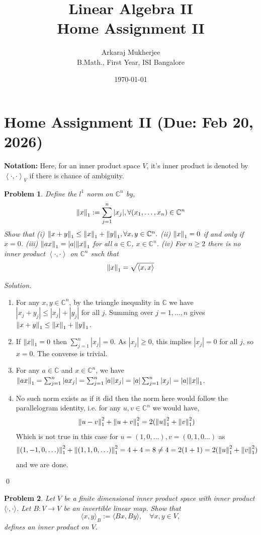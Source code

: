 \documentclass[12pt,a4paper]{article}
\title{\textbf{Linear Algebra II} \\ \large Home Assignment II}
\author{Arkaraj Mukherjee \\ B.Math., First Year, ISI Bangalore}
\date{\today}
\newenvironment{solution}{%
  \par\noindent\textit{Solution.}\ }{\qed}
\theoremstyle{problemstyle}
\newtheorem{problem}{Problem}[section]
\def\bC{\mathbb{C}}
\newcommand{\inp}[2]{{\left\langle{#1},{#2}\right\rangle}}
\begin{document}
\maketitle
\newpage
\tableofcontents
\newpage
\section{Home Assignment II (Due: Feb 20, 2026)}
\noindent \textbf{Notation:} Here, for an inner product space $V$, it's inner product is denoted by $\inp{\cdot}{\cdot}_V$ if there is chance of ambiguity.
\begin{problem}\label{prob:2-1}
Define the $l^1$ norm on $\bC^n$ by,
\[\norm{x}_1:=\sum_{j=1}^n|x_j|,\forall(x_1,\ldots,x_n)\in\bC^n\]
Show that (i) $\norm{x+y}_1\leq\norm{x}_1+\norm{y}_1,\forall x,y\in\bC^n.$ (ii) $\norm{x}_1=0$ if and only if $x=0$.
(iii) $\norm{ax}_1=|a|\norm{x}_1$ for all $a\in\bC$, $x\in\bC^n$.
(iv) For $n\geq 2$ there is no inner product $\inp{\cdot}{\cdot}$ on $\bC^n$ such that
\[\norm{x}_1=\sqrt{\inp{x}{x}}\]
\end{problem}
\begin{solution}
	\begin{enumerate}[label=(\roman*)]
    \item For any $x,y\in\bC^n$, by the triangle inequality in $\bC$ we have $|x_j+y_j|\le|x_j|+|y_j|$ for all $j$.
Summing over $j=1,\ldots,n$ gives $\norm{x+y}_1\le\norm{x}_1+\norm{y}_1$.
    \item If $\norm{x}_1=0$ then $\sum_{j=1}^n|x_j|=0$.
As $|x_j|\ge 0$, this implies $|x_j|=0$ for all $j$, so $x=0$. The converse is trivial.
    \item For any $a\in\bC$ and $x\in\bC^n$, we have $\norm{ax}_1=\sum_{j=1}^n|ax_j|=\sum_{j=1}^n|a||x_j|=|a|\sum_{j=1}^n|x_j|=|a|\norm{x}_1$.
    \item No such norm exists as if it did then the norm here would follow the parallelogram identity, i.e. for any $u,v\in\bC^n$ we would have,
	$$\norm{u-v}_1^2+\norm{u+v}_1^2=2(\norm{u}_1^2+\norm{v}_1^2)$$
	Which is not true in this case for $u=(1,0,\ldots),v=(0,1,0\ldots)$ as
$$\norm{(1,-1,0,\ldots)}_1^2+\norm{(1,1,0,\ldots)}_1^2=4+4=8\neq4=2(1+1)=2(\norm{u}_1^2+\norm{v}_1^2)$$
	and we are done.
	\end{enumerate}
\end{solution}
\begin{problem}\label{prob:2-2}
Let $V$ be a finite dimensional inner product space with inner product $\langle \cdot, \cdot \rangle$.
Let $B:V\rightarrow V$ be an invertible linear map. Show that
$$\langle x,y \rangle_B := \langle Bx, By \rangle, \quad \forall x, y \in V,$$
defines an inner product on $V$.
\end{problem}
\end{document}
